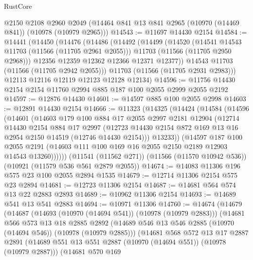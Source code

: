 \begin{lexlean}{RustCore}
\begin{coremodule}
    @2150
    @2108
    @2960
    @2049
    (@14464 @841 @13 @841 @2965 (@10970 (@14469 @841)) (@10978 (@10979 @2965)))
@14543 := @11697 @14430 @2154
@14584 := @14441
    (@14450
      (@14476
        (@14486
          (@14492
            (@14499
              (@14520
                (@14541 @14543 @11703 (@11566 (@11705 @2961 @2055)))
                @11703
                (@11566 (@11705 @2950 @2968)))
              @12356
              @12359
              @12362
              @12366
              @12371
              @12377))
          @14543
          @11703
          (@11566 (@11705 @2942 @2055)))
        @11703
        (@11566 (@11705 @2931 @2983)))
      @12113
      @12116
      @12119
      @12123
      @12128
      @12134)
@14596 := @11756 @14430 @2154 @2154 @11760 @2994 @885 @187 @100 @2055 @2999 @2055 @2192
@14597 := @12876 @14430
@14601 := @14597 @885 @100 @2055 @2998
@14603 := @12891 @14430 @2154
@14666 := @11323
    (@14325
      (@14424
        (@14584
          (@14596
            (@14601
              (@14603
                @179
                @100
                @884
                @17
                @2055
                @2997
                @2181
                @12904
                (@12714
                  @14430
                  @2154
                  @884
                  @17
                  @2997
                  (@12723 @14430 @2154 @872 @169 @13 @16 @2954 @2150 @14519 (@12746 @14430 @2154)))
                @13233))
            (@14597
              @187
              @100
              @2055
              @2191
              (@14603 @111 @100 @169 @16 @2055 @2150 @2189 @12903 @14543 @13260))))))
    (@11541 (@11562 @271))
    (@11566 (@11570 @10942 @536))
    (@10921 (@11579 @536 @561 @2879 @2055))
@14674 := @14083 @11306 @196 @575 @23 @100 @2055 @2894 @1535
@14679 := @12714 @11306 @2154 @575 @23 @2894
@14681 := @12723 @11306 @2154
@14687 := @14681 @564 @574 @13 @22 @2883 @2893
@14689 := @10962 @11306 @2154
@14693 := @14689 @541 @13 @541 @2883
@14694 := @10971 @11306
@14760 := @14674
    (@14679
      (@14687
        (@14693 (@10970 (@14694 @541)) (@10978 (@10979 @2883)))
        (@14681
          @566
          @573
          @13
          @18
          @2885
          @2892
          (@14689 @546 @13 @546 @2885 (@10970 (@14694 @546)) (@10978 (@10979 @2885)))
          (@14681
            @568
            @572
            @13
            @17
            @2887
            @2891
            (@14689 @551 @13 @551 @2887 (@10970 (@14694 @551)) (@10978 (@10979 @2887)))
            (@14681
              @570
              @169

\end{coremodule}
\end{lexlean}
